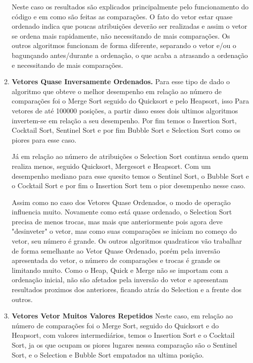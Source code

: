 \documentclass{article}
\begin{document}
\begin{enumerate}
	Neste caso os resultados são explicados principalmente pelo funcionamento do código e em como são feitas as comparações. O fato do vetor estar quase ordenado indica que poucas atribuições deverão ser realizadas e assim o vetor se ordena mais rapidamente, não necessitando de mais comparações. Os outros algoritmos funcionam de forma diferente, separando o vetor e/ou o bagunçando antes/durante a ordenação, o que acaba a atrasando a ordenação e necessitando de mais comparações.
	
	\item \textbf{Vetores Quase Inversamente Ordenados.}
	Para esse tipo de dado o algoritmo que obteve o melhor desempenho em relação ao número de comparações foi o Merge Sort seguido do Quicksort e pelo Heapsort, isso Para vetores de até 100000 posições, a partir disso esses dois ultimos algoritmos invertem-se em relação a seu desempenho. Por fim temos o Insertion Sort, Cocktail Sort, Sentinel Sort e por fim Bubble Sort e Selection Sort como os piores para esse caso.
	
	Já em relação ao número de atribuições o Selection Sort continua sendo quem realiza menos, seguido Quicksort, Mergesort e Heapsort. Com um desempenho mediano para esse quesito temos o Sentinel Sort, o Bubble Sort e o Cocktail Sort e por fim o Insertion Sort tem o pior desempenho nesse caso.
	
	Assim como no caso dos Vetores Quase Ordenados, o modo de operação influencia muito. Novamente como está quase ordenado, o Selection Sort precisa de menos trocas, mas mais que anteriormente pois agora deve "desinveter" o vetor, mas como suas comparações se iniciam no começo do vetor, seu número é grande. Os outros algoritmos quadraticos vão trabalhar de forma semelhante ao Vetor Quase Ordenado, porém pela inversão apresentada do vetor, o número de comparações e trocas é grande os limitando muito. Como o Heap, Quick e Merge não se importam com a ordenação inicial, não são afetados pela inversão do vetor e apresentam resultados proximos dos anteriores, ficando atrás do Selection e a frente dos outros.
	
	\item \textbf{Vetores Vetor Muitos Valores Repetidos}
	Neste caso, em relação ao número de comparações foi o Merge Sort, seguido do Quicksort e do Heapsort, com valores intermediários, temos o Insertion Sort e o Cocktail Sort, ja os que ocupam os piores lugares nesssa comparação são o Sentinel Sort, e o Selection e Bubble Sort empatados na ultima posição.
	

\end{enumerate}
\end{document}
